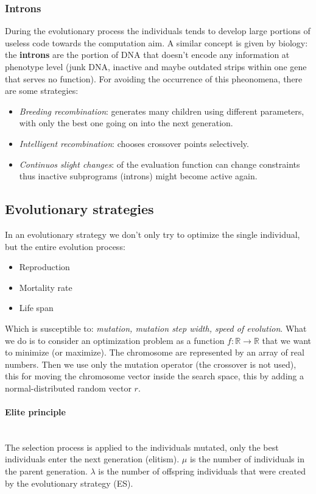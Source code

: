 \documentclass{article}
\begin{document}
\subsubsection{Introns}
During the evolutionary process the individuals tends to develop large portions of useless
code towards the computation aim. A similar concept is given by biology: the \textbf{introns}
are the portion of DNA that doesn't encode any information at phenotype level (junk DNA,
inactive and maybe outdated strips within one gene that serves no function). For avoiding
the occurrence of this pheonomena, there are some strategies:
\begin{itemize}
    \item \textit{Breeding recombination}: generates many children
          using different parameters, with only the best one
          going on into the next generation.
    \item \textit{Intelligent recombination}:  chooses crossover points
          selectively.
    \item \textit{Continuos slight changes}:  of the evaluation function
          can change constraints thus inactive subprograms
          (introns) might become active again.
\end{itemize}

\subsection{Evolutionary strategies}
In an evolutionary strategy we don't only try to optimize the single individual, but the entire
evolution process:
\begin{itemize}
    \item Reproduction
    \item Mortality rate
    \item Life span
\end{itemize}
Which is susceptible to: \textit{mutation, mutation step width, speed of evolution}.
\newline\newline
What we do is to consider an optimization problem as a function $f:\mathbb{R}\rightarrow\mathbb{R}$
that we want to minimize (or maximize). The chromosome are represented by an array of real numbers.
Then we use only the mutation operator (the crossover is not used), this for moving the chromosome
vector inside the search space, this by adding a normal-distributed random vector $r$.

\paragraph{Elite principle}\mbox{}\\
The selection process is applied to the individuals mutated, only the best individuals
enter the next generation (elitism). $\mu$ is the number of individuals in the parent generation.
$\lambda$ is the number of offspring individuals that were created by the evolutionary strategy (ES).
\end{document}
